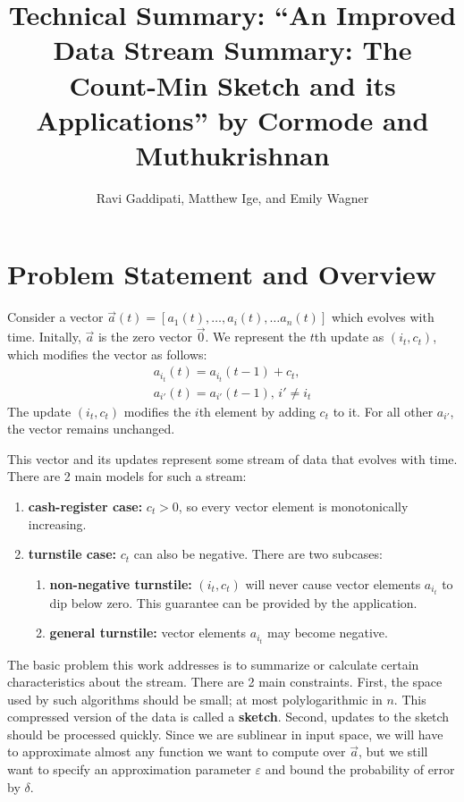 \documentclass[11pt]{article}
\title{Technical Summary: ``An Improved Data Stream Summary: The Count-Min Sketch and its Applications'' 
by Cormode and Muthukrishnan}
\author{Ravi Gaddipati, Matthew Ige, and Emily Wagner}
\begin{document}
\maketitle
\section{Problem Statement and Overview}
Consider a vector $\vec{a}(t) = [a_1(t), \dots, a_i(t), \dots a_n(t)]$ which evolves with time.
Initally, $\vec{a}$ is the zero vector $\vec{0}$.  We represent the $t$th update as $(i_t, c_t)$,
which modifies the vector as follows:
\begin{align}
    a_{i_t}(t) = a_{i_t}(t - 1) + c_t, \\
    a_{i'}(t) = a_{i'}(t - 1), \, i' \neq i_t
\end{align}
The update $(i_t, c_t)$ modifies the $i$th element by adding $c_t$ to it.
For all other $a_{i'}$, the vector remains unchanged. 

This vector and its updates represent some stream of data that evolves with
time. There are 2 main models for such a stream:
\begin{enumerate}
    \item \textbf{cash-register case:} $c_t > 0$, so every vector element is monotonically
    increasing.
    \item \textbf{turnstile case:} $c_t$ can also be negative.  There are two subcases:
    \begin{enumerate}
        \item \textbf{non-negative turnstile:} $(i_t, c_t)$ will never cause vector elements
        $a_{i_t}$ to dip below zero. This guarantee can be provided by the application.
        \item \textbf{general turnstile:} vector elements $a_{i_t}$ may become negative.
    \end{enumerate}
\end{enumerate}

The basic problem this work addresses is to summarize or calculate certain characteristics
about the stream. There are 2 main constraints. First, the space used by such algorithms should be small; at most polylogarithmic
in $n$.  This compressed version of the data is called a \textbf{sketch}.  Second, updates to the sketch should be processed quickly.  Since we are sublinear in input space,
we will have to approximate almost any function we want to compute over $\vec{a}$, but
we still want to specify an approximation parameter $\varepsilon$ and bound the probability
of error by $\delta$.  
\end{document}
